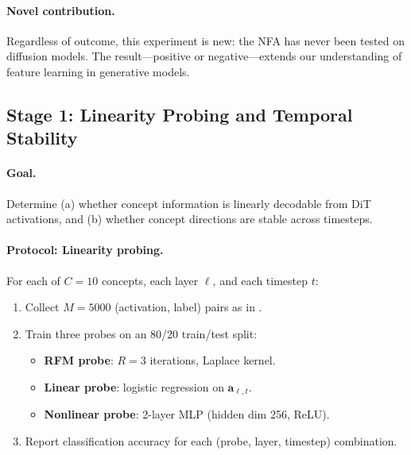 \documentclass[11pt]{article}
\newcommand{\ba}{\mathbf{a}}
\begin{document}
\paragraph{Novel contribution.}
Regardless of outcome, this experiment is new: the NFA has never been tested on diffusion models.
The result---positive or negative---extends our understanding of feature learning in generative models.

\subsection{Stage 1: Linearity Probing and Temporal Stability}
\label{sec:exp_stage1}

\paragraph{Goal.} Determine (a) whether concept information is linearly decodable from DiT activations, and (b) whether concept directions are stable across timesteps.

\paragraph{Protocol: Linearity probing.}
For each of $C = 10$ concepts, each layer $\ell$, and each timestep $t$:
\begin{enumerate}[leftmargin=*]
    \item Collect $M = 5000$ (activation, label) pairs as in .
    \item Train three probes on an 80/20 train/test split:
    \begin{itemize}
        \item \textbf{RFM probe}: $R = 3$ iterations, Laplace kernel.
        \item \textbf{Linear probe}: logistic regression on $\ba_{\ell,t}$.
        \item \textbf{Nonlinear probe}: 2-layer MLP (hidden dim 256, ReLU).
    \end{itemize}
    \item Report classification accuracy for each (probe, layer, timestep) combination.
\end{enumerate}
\end{document}
